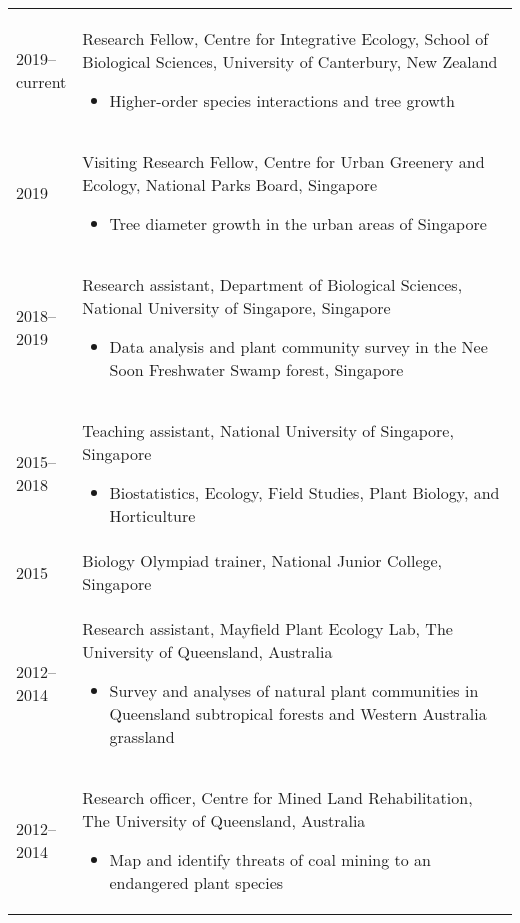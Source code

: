 \documentclass[a4paper]{article}
\begin{document}
\begin{tabular}{p{0.13\linewidth} p{0.87\linewidth}}

2019--current & Research Fellow, Centre for Integrative Ecology, School of Biological Sciences, University of Canterbury, New Zealand
\begin{itemize} 
\item Higher-order species interactions and tree growth
\end{itemize} \\

2019 & Visiting Research Fellow, Centre for Urban Greenery and Ecology, National Parks Board, Singapore
\begin{itemize} 
\item Tree diameter growth in the urban areas of Singapore
\end{itemize} \\

2018--2019 & Research assistant, Department of Biological Sciences, National University of Singapore, Singapore
\begin{itemize} 
\item Data analysis and plant community survey in the Nee Soon Freshwater Swamp forest, Singapore
\end{itemize} \\

2015--2018 & Teaching assistant, National University of Singapore, Singapore
\begin{itemize} 
\item Biostatistics, Ecology, Field Studies, Plant Biology, and Horticulture
\end{itemize} \\

2015 & Biology Olympiad trainer, National Junior College, Singapore \\

2012--2014 & Research assistant, Mayfield Plant Ecology Lab, The University of Queensland, Australia 
\begin{itemize}
\item Survey and analyses of natural plant communities in Queensland subtropical forests and Western Australia grassland 
\end{itemize} \\

2012--2014 & Research officer, Centre for Mined Land Rehabilitation, The University of Queensland, Australia
\begin{itemize} 
\item Map and identify threats of coal mining to an endangered plant species
\end{itemize} \\


\end{tabular}
\end{document}
